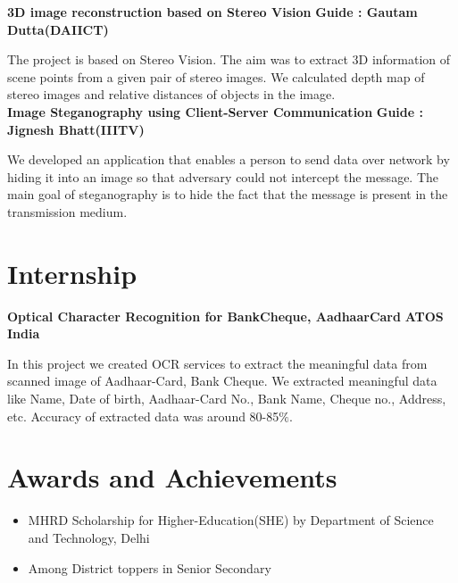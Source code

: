 \documentclass{article}
\begin{document}
\vspace*{2mm}
\textbf{\large{3D image reconstruction based on Stereo Vision}} \hspace*{3.1cm} \textbf{Guide : Gautam Dutta(DAIICT)}

\vspace*{.031mm}
\hspace*{2.6mm} The project is based on Stereo Vision. The aim was to extract 3D information of scene points from a given pair of stereo images. We calculated depth map of stereo images and relative distances of objects in the image.\\

\vspace*{2mm}
\textbf{\large{Image Steganography using Client-Server Communication}} \hspace*{1.5cm} \textbf{Guide : Jignesh Bhatt(IIITV)}

\vspace*{.031mm}
\hspace*{2.6mm} We developed an application that enables a person to send data over network by hiding it into an image so that adversary could not intercept the message. The main goal of steganography is to hide the fact that the message is present in the transmission medium.

\newpage
\section{Internship}
\vspace*{2mm}
\textbf{\large{Optical Character Recognition for BankCheque, AadhaarCard}} \hspace*{3cm} \textbf{ATOS India}

\vspace*{.051mm}
\hspace*{2.6mm} In this project we created OCR services to extract the meaningful data from scanned image of Aadhaar-Card, Bank Cheque. We extracted meaningful data like Name, Date of birth, Aadhaar-Card No., Bank Name, Cheque no., Address, etc. Accuracy of extracted data was around 80-85$\%.$%

\vspace*{.3cm}
\section{Awards and Achievements}
\vspace*{2mm}
\begin{itemize}
\item MHRD Scholarship for Higher-Education(SHE) by Department of Science and Technology, Delhi
\item Among District toppers in Senior Secondary
\end{itemize}
\end{document}
